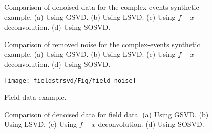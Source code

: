 {\begin{figure}[htb!]
\centering
{}
\caption{Comparison of denoised data for the complex-events synthetic example. (a) Using GSVD. (b) Using LSVD. (c) Using $f-x$ deconvolution. (d) Using SOSVD.}
\label{fig:complex-gsvd,complex-lsvd,complex-fx,complex-svd}
\end{figure}

\begin{figure}[htb!]
\centering
{}
\caption{Comparison of removed noise for the complex-events synthetic example. (a) Using GSVD. (b) Using LSVD. (c) Using $f-x$ deconvolution. (d) Using SOSVD.}
\label{fig:complex-n-gsvd,complex-n-lsvd,complex-n-fx,complex-n-svd}
\end{figure}

\begin{figure}[htb!]
\centering
\texttt{[image: fieldstrsvd/Fig/field-noise]}
\caption{Field data example.}
	\label{fig:field-noise}
\end{figure}

\begin{figure}[htb!]
\centering
{}
\caption{Comparison of denoised data for field data. (a) Using GSVD. (b) Using LSVD. (c) Using $f-x$ deconvolution. (d) Using SOSVD.}
\label{fig:field-gsvd,field-lsvd,field-fx,field-svd}
\end{figure}

}
